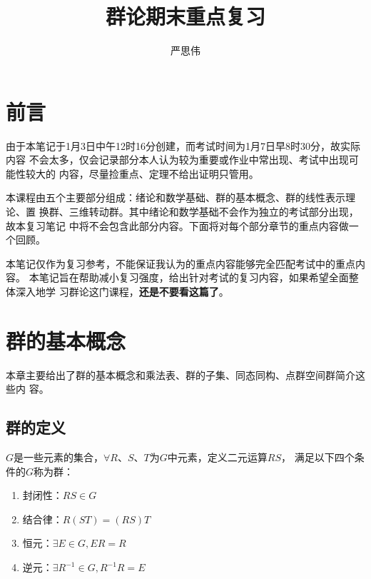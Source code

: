 \documentclass{ctexart}
\begin{document}
\title{群论期末重点复习}
\author[1,2]{严思伟}
\maketitle

\setcounter{tocdepth}{2}%

\tableofcontents
\newpage

\setcounter{page}{1}

\section{前言}

由于本笔记于1月3日中午12时16分创建，而考试时间为1月7日早8时30分，故实际内容
不会太多，仅会记录部分本人认为较为重要或作业中常出现、考试中出现可能性较大的
内容，尽量捡重点、定理不给出证明只管用。

本课程由五个主要部分组成：绪论和数学基础、群的基本概念、群的线性表示理论、置
换群、三维转动群。其中绪论和数学基础不会作为独立的考试部分出现，故本复习笔记
中将不会包含此部分内容。下面将对每个部分章节的重点内容做一个回顾。

本笔记仅作为复习参考，不能保证我认为的重点内容能够完全匹配考试中的重点内容。
本笔记旨在帮助减小复习强度，给出针对考试的复习内容，如果希望全面整体深入地学
习群论这门课程，\textbf{还是不要看这篇了}。

\section{群的基本概念}

本章主要给出了群的基本概念和乘法表、群的子集、同态同构、点群空间群简介这些内
容。

\subsection{群的定义}

$G$是一些元素的集合，$\forall R$、$S$、$T$为$G$中元素，定义二元运算$RS$，
满足以下四个条件的$G$称为群：

\begin{enumerate}
    \item 封闭性：$RS\in G$
    \item 结合律：$R(ST)=(RS)T$
    \item 恒元：$\exists E\in G, ER=R$
    \item 逆元：$\exists R^{-1}\in G, R^{-1}R=E$
\end{enumerate}
\end{document}
